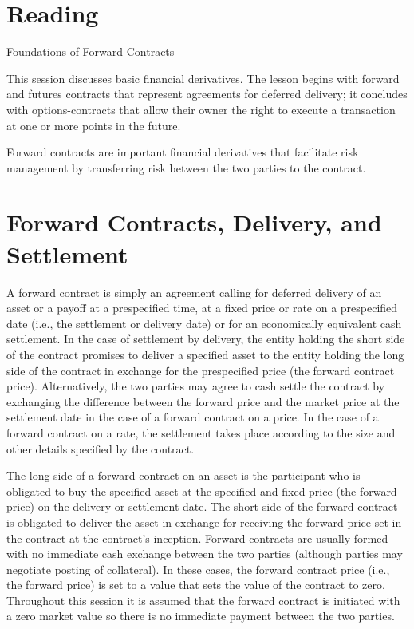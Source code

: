 \documentclass[11pt]{article}
\begin{document}
\section*{Reading}
Foundations of Forward Contracts

This session discusses basic financial derivatives. The lesson begins with forward and futures contracts that represent agreements for deferred delivery; it concludes with options-contracts that allow their owner the right to execute a transaction at one or more points in the future.

Forward contracts are important financial derivatives that facilitate risk management by transferring risk between the two parties to the contract.

\section*{Forward Contracts, Delivery, and Settlement}
A forward contract is simply an agreement calling for deferred delivery of an asset or a payoff at a prespecified time, at a fixed price or rate on a prespecified date (i.e., the settlement or delivery date) or for an economically equivalent cash settlement. In the case of settlement by delivery, the entity holding the short side of the contract promises to deliver a specified asset to the entity holding the long side of the contract in exchange for the prespecified price (the forward contract price). Alternatively, the two parties may agree to cash settle the contract by exchanging the difference between the forward price and the market price at the settlement date in the case of a forward contract on a price. In the case of a forward contract on a rate, the settlement takes place according to the size and other details specified by the contract.

The long side of a forward contract on an asset is the participant who is obligated to buy the specified asset at the specified and fixed price (the forward price) on the delivery or settlement date. The short side of the forward contract is obligated to deliver the asset in exchange for receiving the forward price set in the contract at the contract's inception. Forward contracts are usually formed with no immediate cash exchange between the two parties (although parties may negotiate posting of collateral). In these cases, the forward contract price (i.e., the forward price) is set to a value that sets the value of the contract to zero. Throughout this session it is assumed that the forward contract is initiated with a zero market value so there is no immediate payment between the two parties.
\end{document}
